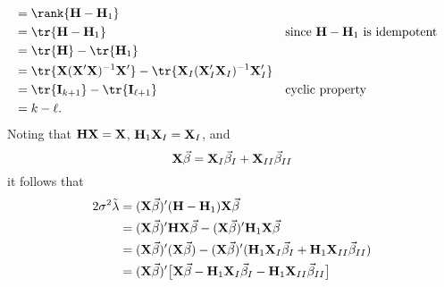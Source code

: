 \begin{Theorem}{}{}
\begin{enumerate}[(1)]
\begin{align*}
                   & =\rank{\Matrix{H}-\Matrix{H}_1}                                                                                                                                                    \\
                   & =\tr{\Matrix{H}-\Matrix{H}_1}                                                                                          &  & \text{since $ \Matrix{H}-\Matrix{H}_1 $ is idempotent} \\
                   & =\tr{\Matrix{H}}-\tr{\Matrix{H}_1}                                                                                                                                                 \\
                   & =\tr{\Matrix{X}(\Matrix{X}'\Matrix{X})^{-1}\Matrix{X}'}-\tr{\Matrix{X}_I(\Matrix{X}_I'\Matrix{X}_I)^{-1}\Matrix{X}_I'}                                                             \\
                   & =\tr{\Matrix{I}_{k+1}}-\tr{\Matrix{I}_{\ell+1}}                                                                        &  & \text{cyclic property}                                 \\
                   & =k-\ell.
              \end{align*}
              Noting that $ \mathbf{H}\mathbf{X}=\mathbf{X} $,  $ \mathbf{H}_1 \mathbf{X}_I=\mathbf{X}_I $, and
              \[ \mathbf{X}\vec{\beta}=\mathbf{X}_I \vec{\beta}_I+\mathbf{X}_{II}\vec{\beta}_{II} \]
              it follows that
              \begin{align*}
                  2\sigma^2\tilde{\lambda}
                   & =(\Matrix{X}\Vector{\beta})'(\Matrix{H}-\Matrix{H}_1)\Matrix{X}\Vector{\beta}                                                                                                                 \\
                   & =(\Matrix{X}\Vector{\beta})'\Matrix{H}\Matrix{X}\Vector{\beta}-(\Matrix{X}\Vector{\beta})'\Matrix{H}_1 \Matrix{X}\Vector{\beta}                                                               \\
                   & =(\Matrix{X}\Vector{\beta})'(\Matrix{X}\Vector{\beta})-(\Matrix{X}\Vector{\beta})'(\Matrix{H}_1\Matrix{X}_I \Vector{\beta}_I+\Matrix{H}_1\Matrix{X}_{II}\Vector{\beta}_{II})                  \\
                   & =(\Matrix{X}\Vector{\beta})'\bigl[\Matrix{X}\Vector{\beta}-\Matrix{H}_1 \Matrix{X}_I \Vector{\beta}_I-\Matrix{H}_1 \Matrix{X}_{II}\Vector{\beta}_{II}\bigr]                                   \\

\end{align*}
\end{enumerate}
\end{Theorem}
